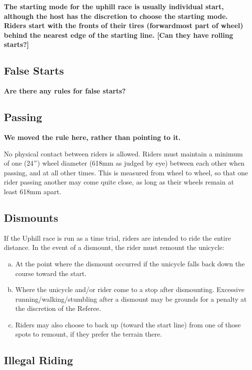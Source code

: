 \textbf{The starting mode for the uphill race is usually individual 
start, although the host has the discretion to choose the starting 
mode. Riders start with the fronts of their tires (forwardmost part of wheel)
 behind the nearest edge of the starting line. [Can they have rolling starts?]}

\subsection{False Starts}

\textbf{Are there any rules for false starts?}

\subsection{Passing}

\textbf{We moved the rule here, rather than pointing to it.}

No physical contact between riders is allowed.
Riders must maintain a minimum of one (24$"$) wheel diameter (618mm as judged by eye) between each other when passing, and at all other times.
This is measured from wheel to wheel, so that one rider passing another may come quite close, as long as their wheels remain at least 618mm apart.

\subsection{Dismounts}
If the Uphill race is run as a time trial, riders are intended to ride the entire distance.
In the event of a dismount, the rider must remount the unicycle:
\begin{enumerate}[(a)]
\item At the point where the dismount occurred if the unicycle falls back down the course toward the start.
\item Where the unicycle and/or rider come to a stop after dismounting.
Excessive running/walking/stumbling after a dismount may be grounds for a
penalty at the discretion of the Referee.
\item Riders may also choose to back up (toward the start line) from one of those spots to remount, if they prefer the terrain there.
\end{enumerate}

\subsection{Illegal Riding}


